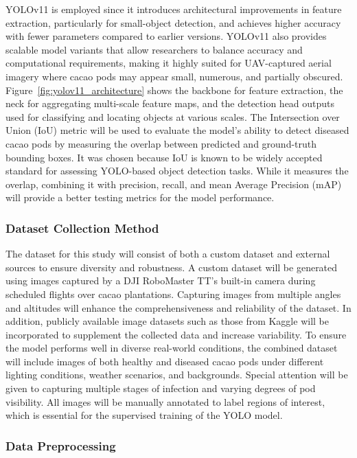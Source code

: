 YOLOv11 is employed since it introduces architectural improvements in feature extraction, particularly for small-object detection, and achieves higher accuracy with fewer parameters compared to earlier versions. YOLOv11 also provides scalable model variants that allow researchers to balance accuracy and computational requirements, making it highly suited for UAV-captured aerial imagery where cacao pods may appear small, numerous, and partially obscured. Figure~\ref{fig:yolov11_architecture} shows the  backbone for feature extraction, the neck for aggregating multi-scale feature maps, and the detection head outputs used for classifying and locating objects at various scales. The Intersection over Union (IoU) metric will be used to evaluate the model’s ability to detect diseased cacao pods by measuring the overlap between predicted and ground-truth bounding boxes. It was chosen because IoU is known to be widely accepted standard for assessing YOLO-based object detection tasks. While it measures the overlap, combining it with precision, recall, and mean Average Precision (mAP) will provide a better testing metrics for the model performance.

\subsubsection*{Dataset Collection Method}

The dataset for this study will consist of both a custom dataset and external sources to ensure diversity and robustness. A custom dataset will be generated using images captured by a DJI RoboMaster TT’s built-in camera during scheduled flights over cacao plantations. Capturing images from multiple angles and altitudes will enhance the comprehensiveness and reliability of the dataset. In addition, publicly available image datasets such as those from Kaggle will be incorporated to supplement the collected data and increase variability. To ensure the model performs well in diverse real-world conditions, the combined dataset will include images of both healthy and diseased cacao pods under different lighting conditions, weather scenarios, and backgrounds. Special attention will be given to capturing multiple stages of infection and varying degrees of pod visibility. All images will be manually annotated to label regions of interest, which is essential for the supervised training of the YOLO model.

\subsubsection*{Data Preprocessing}


